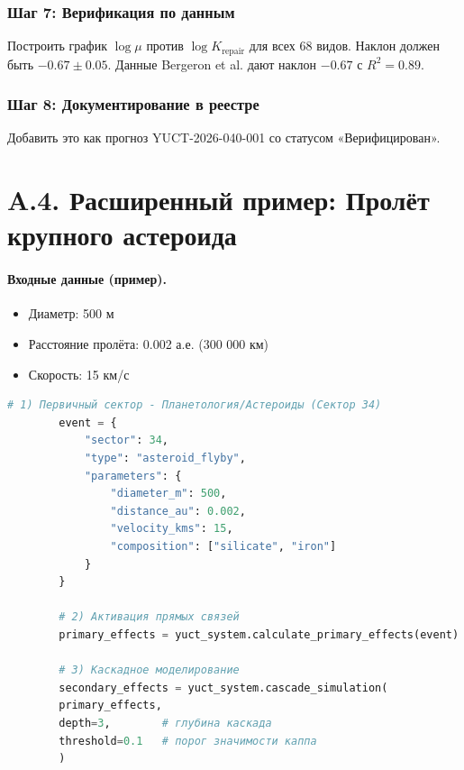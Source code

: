\documentclass[11pt,a4paper]{article}
\begin{document}
	\subsubsection*{Шаг 7: Верификация по данным}
	Построить график \(\log \mu\) против \(\log K_{\mathrm{repair}}\) для всех 68 видов. Наклон должен быть \(-0.67 \pm 0.05\). Данные Bergeron et al. дают наклон \(-0.67\) с \(R^2 = 0.89\).
	
	\subsubsection*{Шаг 8: Документирование в реестре}
	Добавить это как прогноз YUCT-2026-040-001 со статусом «Верифицирован».
	
	\section*{A.4. Расширенный пример: Пролёт крупного астероида}
	
	\paragraph{Входные данные (пример).}
	\begin{itemize}[leftmargin=*]
		\item Диаметр: 500 м
		\item Расстояние пролёта: 0.002 а.е. (300 000 км)
		\item Скорость: 15 км/с
	\end{itemize}
	
	\begin{lstlisting}[language=Python]
		# 1) Первичный сектор - Планетология/Астероиды (Сектор 34)
		event = {
			"sector": 34,
			"type": "asteroid_flyby",
			"parameters": {
				"diameter_m": 500,
				"distance_au": 0.002,
				"velocity_kms": 15,
				"composition": ["silicate", "iron"]
			}
		}
		
		# 2) Активация прямых связей
		primary_effects = yuct_system.calculate_primary_effects(event)
		
		# 3) Каскадное моделирование
		secondary_effects = yuct_system.cascade_simulation(
		primary_effects,
		depth=3,        # глубина каскада
		threshold=0.1   # порог значимости каппа
		)
	\end{lstlisting}
	
\end{document}
